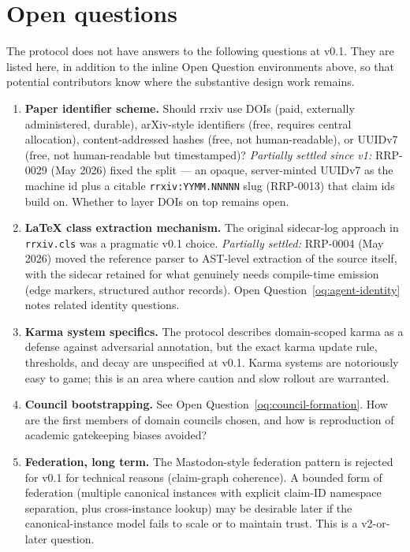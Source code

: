 \documentclass[11pt]{rrxiv}
\begin{document}
\section{Open questions}
\label{sec:open-questions}

The protocol does not have answers to the following questions at v0.1. They are listed here, in addition to the inline Open Question environments above, so that potential contributors know where the substantive design work remains.

\begin{enumerate}[leftmargin=2em, itemsep=0.4em]

\item \textbf{Paper identifier scheme.} Should rrxiv use DOIs (paid, externally administered, durable), arXiv-style identifiers (free, requires central allocation), content-addressed hashes (free, not human-readable), or UUIDv7 (free, not human-readable but timestamped)? \emph{Partially settled since v1:} RRP-0029 (May 2026) fixed the split --- an opaque, server-minted UUIDv7 as the machine id plus a citable \texttt{rrxiv:YYMM.NNNNN} slug (RRP-0013) that claim ids build on. Whether to layer DOIs on top remains open.

\item \textbf{LaTeX class extraction mechanism.} The original sidecar-log approach in \texttt{rrxiv.cls} was a pragmatic v0.1 choice. \emph{Partially settled:} RRP-0004 (May 2026) moved the reference parser to AST-level extraction of the source itself, with the sidecar retained for what genuinely needs compile-time emission (edge markers, structured author records). Open Question~\ref{oq:agent-identity} notes related identity questions.

\item \textbf{Karma system specifics.} The protocol describes domain-scoped karma as a defense against adversarial annotation, but the exact karma update rule, thresholds, and decay are unspecified at v0.1. Karma systems are notoriously easy to game; this is an area where caution and slow rollout are warranted.

\item \textbf{Council bootstrapping.} See Open Question~\ref{oq:council-formation}. How are the first members of domain councils chosen, and how is reproduction of academic gatekeeping biases avoided?

\item \textbf{Federation, long term.} The Mastodon-style federation pattern is rejected for v0.1 for technical reasons (claim-graph coherence). A bounded form of federation (multiple canonical instances with explicit claim-ID namespace separation, plus cross-instance lookup) may be desirable later if the canonical-instance model fails to scale or to maintain trust. This is a v2-or-later question.


\end{enumerate}
\end{document}
